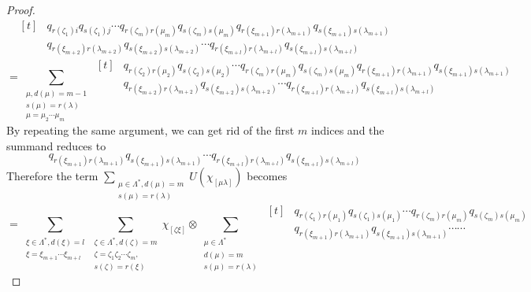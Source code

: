 \documentclass{amsart}
\theoremstyle{plain}
\theoremstyle{definition}
\theoremstyle{remark}
\numberwithin{equation}{section}
\begin{document}
\begin{proof}
\begin{equation*}
    \begin{aligned}[t]
        &q_{r(\zeta_{1})i}q_{s(\zeta_{1})j}\cdots q_{r(\zeta_{m})r(\mu_{m})}q_{s(\zeta_{m})s(\mu_{m})}
q_{r(\xi_{m+1})r(\lambda_{m+1})}q_{s(\xi_{m+1})s(\lambda_{m+1})} \\
&q_{r(\xi_{m+2})r(\lambda_{m+2})}q_{s(\xi_{m+2})s(\lambda_{m+2})} \cdots q_{r(\xi_{m+l})r(\lambda_{m+l})}q_{s(\xi_{m+l})s(\lambda_{m+l})}
    \end{aligned}
\end{equation*}
\begin{equation*}
    =\sum\limits_{\substack{\mu, d(\mu)=m-1 \\ s(\mu)=r(\lambda) \\ \mu=\mu_{2}\cdots\mu_{m}}}
    \begin{aligned}[t]
        &q_{r(\zeta_{2})r(\mu_{2})}q_{s(\zeta_{2})s(\mu_{2})}\cdots q_{r(\zeta_{m})r(\mu_{m})}q_{s(\zeta_{m})s(\mu_{m})}q_{r(\xi_{m+1})r(\lambda_{m+1})}q_{s(\xi_{m+1})s(\lambda_{m+1})} \\
        &q_{r(\xi_{m+2})r(\lambda_{m+2})}q_{s(\xi_{m+2})s(\lambda_{m+2})}\cdots  q_{r(\xi_{m+l})r(\lambda_{m+l})}q_{s(\xi_{m+l})s(\lambda_{m+l})}
    \end{aligned}
\end{equation*}
By repeating the same argument, we can get rid of the first $m$ indices and the summand reduces to 
\[
q_{r(\xi_{m+1})r(\lambda_{m+1})}q_{s(\xi_{m+1})s(\lambda_{m+1})} \cdots q_{r(\xi_{m+l})r(\lambda_{m+l})}q_{s(\xi_{m+l})s(\lambda_{m+l})}
\]
Therefore the term $ \sum\limits_{\substack{\mu\in \Lambda^{\ast}, d(\mu)=m\\
s(\mu)=r(\lambda)}}U(\chi_{[\mu\lambda]})$ becomes
\begin{equation*}
    =\sum\limits_{\substack{\xi\in \Lambda^{\ast}, d(\xi)=l \\ \xi=\xi_{m+1}\cdots\xi_{m+l}}}\sum\limits_{\substack{\zeta\in \Lambda^{\ast} , d(\zeta)=m\\ \zeta=\zeta_{1}\zeta_{2}\cdots\zeta_{m}, \\ s(\zeta)=r(\xi)}}\chi_{[\zeta\xi]} \otimes \sum\limits_{\substack{\mu\in \Lambda^{\ast} \\ d(\mu)=m\\ s(\mu)=r(\lambda)}} 
    \begin{aligned}[t]
        &q_{r(\zeta_{1})r(\mu_{1})}q_{s(\zeta_{1})s(\mu_{1})}\cdots q_{r(\zeta_{m})r(\mu_{m})}q_{s(\zeta_{m})s(\mu_{m})}\\
        &q_{r(\xi_{m+1})r(\lambda_{m+1})}q_{s(\xi_{m+1})s(\lambda_{m+1})}\cdots\cdots\\

\end{aligned}
\end{equation*}
\end{proof}
\end{document}
